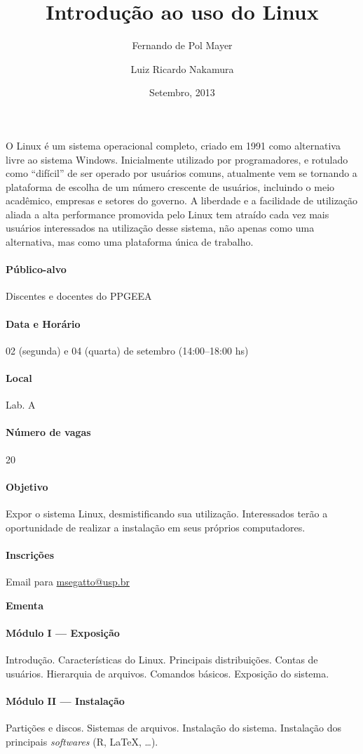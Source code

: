\documentclass[a4paper,12pt]{article}
\title{Introdução ao uso do Linux}
\author{Fernando de Pol Mayer \and Luiz Ricardo Nakamura}
\date{Setembro, 2013}
\providecommand{\R}{\textsf{R}\xspace}
\begin{document}
\maketitle
\thispagestyle{empty}

O Linux é um sistema operacional completo, criado em 1991 como
alternativa livre ao sistema Windows. Inicialmente utilizado por
programadores, e rotulado como ``difícil'' de ser operado por usuários
comuns, atualmente vem se tornando a plataforma de escolha de um número
crescente de usuários, incluindo o meio acadêmico, empresas e setores do
governo. A liberdade e a facilidade de utilização aliada a alta
performance promovida pelo Linux tem atraído cada vez mais usuários
interessados na utilização desse sistema, não apenas como uma
alternativa, mas como uma plataforma única de trabalho.

\paragraph{Público-alvo} Discentes e docentes do PPGEEA

\paragraph{Data e Horário} 02 (segunda) e 04 (quarta) de setembro (14:00--18:00 hs)

\paragraph{Local} Lab. A

\paragraph{Número de vagas} 20

\paragraph{Objetivo} Expor o sistema Linux, desmistificando sua
utilização. Interessados terão a oportunidade de realizar a instalação
em seus próprios computadores.

\paragraph{Inscrições} Email para \url{msegatto@usp.br}

\begin{center}
  \textbf{Ementa}
\end{center}

\paragraph{Módulo I --- Exposição} Introdução. Características do
Linux. Principais distribuições. Contas de usuários. Hierarquia de
arquivos. Comandos básicos. Exposição do sistema.

\paragraph{Módulo II --- Instalação} Partições e discos. Sistemas de
arquivos. Instalação do sistema. Instalação dos principais
\textit{softwares} (\R, \LaTeX, \ldots).
\end{document}
